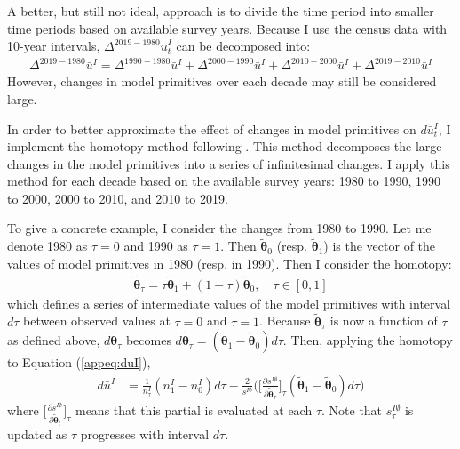 A better, but still not ideal, approach is to divide the time period into smaller time periods based on available survey years. Because I use the census data with 10-year intervals, $\Delta^{2019-1980} \bar{u}^I_t$ can be decomposed into:
\begin{align*}
	\Delta^{2019-1980} \bar{u}^I = \Delta^{1990-1980} \bar{u}^I +  \Delta^{2000-1990} \bar{u}^I + \Delta^{2010-2000} \bar{u}^I + \Delta^{2019-2010} \bar{u}^I 
\end{align*}
However, changes in model primitives over each decade may still be considered large. 

In order to better approximate the effect of changes in model primitives on $d\bar{u}^I_t$, I implement the homotopy method following \cite{Judd_1998_book}. This method decomposes the large changes in the model primitives into a series of infinitesimal changes. I apply this method for each decade based on the available survey years: 1980 to 1990, 1990 to 2000, 2000 to 2010, and 2010 to 2019. 

\vspace{4mm}
To give a concrete example, I consider the changes from 1980 to 1990. Let me denote 1980 as $\tau = 0$ and 1990 as $\tau = 1$. Then $\tilde{\boldsymbol{\theta}}_0$ (resp. $\tilde{\boldsymbol{\theta}}_1$)  is the vector of the values of model primitives in 1980 (resp. in 1990). Then I consider the homotopy:
\begin{align*}
	\tilde{\boldsymbol{\theta}}_\tau = \tau \tilde{\boldsymbol{\theta}}_1 + (1-\tau) \tilde{\boldsymbol{\theta}}_0, \quad \tau \in [0,1]
\end{align*}
which defines a series of intermediate values of the model primitives with interval $d\tau$ between observed values at $\tau = 0$ and $\tau = 1$. Because $\tilde{\boldsymbol{\theta}}_\tau$ is now a function of $\tau$ as defined above, $d\tilde{\boldsymbol{\theta}}_\tau$ becomes $d\tilde{\boldsymbol{\theta}}_\tau = (\tilde{\boldsymbol{\theta}}_1 - \tilde{\boldsymbol{\theta}}_0)d\tau$. Then, applying the homotopy to Equation (\ref{appeq:duI}),
\begin{align}
	d\bar{u}^I &= \frac{1}{n^I_\tau}(n^I_1 - n^I_0)d\tau -  \frac{2}{s^{I\emptyset}} \Big(  \Big[\frac{\partial s^{I\emptyset} }{\partial \tilde{\boldsymbol{\theta}}_\tau} \Big]_\tau (\tilde{\boldsymbol{\theta}}_1 - \tilde{\boldsymbol{\theta}}_0)d\tau  \Big) \label{appeq:duI-homotopy}
\end{align}
where $\Big[\frac{\partial s^{I\emptyset}}{\partial \tilde{\boldsymbol{\theta}}_t} \Big]_\tau$ means that this partial is evaluated at each $\tau$. Note that $s^{I\emptyset}_\tau$ is updated as $\tau$ progresses with interval $d\tau$. 

